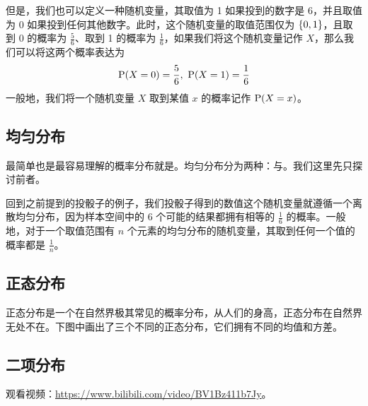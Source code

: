 \documentclass{styles/main}
\begin{document}
  但是，我们也可以定义一种随机变量，其取值为 1 如果投到的数字是 6，并且取值为 0 如果投到任何其他数字。此时，这个随机变量的取值范围仅为 $\set{0, 1}$，且取到 0 的概率为 $\frac{5}{6}$、取到 1 的概率为 $\frac{1}{6}$，如果我们将这个随机变量记作 $X$，那么我们可以将这两个概率表达为
  $$ \operatorname{\mathrm{P}}(X = 0) = \frac{5}{6},\ \operatorname{\mathrm{P}}(X = 1) = \frac{1}{6} $$
  一般地，我们将一个随机变量 $X$ 取到某值 $x$ 的概率记作 $\operatorname{\mathrm{P}}(X = x)$。
  


%  


\subsection{均匀分布}

  最简单也是最容易理解的概率分布就是。均匀分布分为两种：与。我们这里先只探讨前者。
  
  回到之前提到的投骰子的例子，我们投骰子得到的数值这个随机变量就遵循一个离散均匀分布，因为样本空间中的 6 个可能的结果都拥有相等的 $\frac{1}{6}$ 的概率。一般地，对于一个取值范围有 $n$ 个元素的均匀分布的随机变量，其取到任何一个值的概率都是 $\frac{1}{n}$。
  

\subsection{正态分布}
  
  正态分布是一个在自然界极其常见的概率分布，从人们的身高，正态分布在自然界无处不在。下图中画出了三个不同的正态分布，它们拥有不同的均值和方差。
  
  \begin{figure}[h!]
  \centering
  \end{figure}


\subsection{二项分布}
  
  观看视频：\url{https://www.bilibili.com/video/BV1Bz411b7Jy}。
\end{document}
